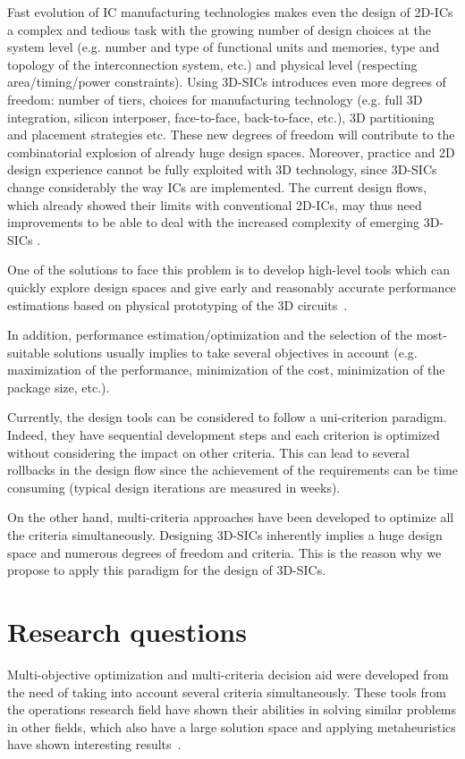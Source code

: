 Fast evolution of IC manufacturing technologies makes even the design of 2D-ICs a complex and tedious task with the growing number of design choices at the system level (e.g. number and type of functional units and memories, type and topology of the interconnection system, etc.) and physical level (respecting area/timing/power constraints). Using 3D-SICs introduces even more degrees of freedom: number of tiers, choices for manufacturing technology (e.g. full 3D integration, silicon interposer, face-to-face, back-to-face, etc.), 3D partitioning and placement strategies etc. These new degrees of freedom will contribute to the combinatorial explosion of already huge design spaces. Moreover, practice and 2D design experience cannot be fully exploited with 3D technology, since 3D-SICs change considerably the way ICs are implemented. The current design flows, which already showed their limits with conventional 2D-ICs, may thus need improvements to be able to deal with the increased complexity of emerging 3D-SICs \cite{vanderbiest06, PFF10}.

One of the solutions to face this problem is to develop high-level tools which can quickly explore design spaces and give early and reasonably accurate performance estimations based on physical prototyping of the 3D circuits~\cite{PFF10}.

In addition, performance estimation/optimization and the selection of the most-suitable solutions usually implies to take several objectives in account (e.g. maximization of the performance, minimization of the cost, minimization of the package size, etc.).

Currently, the design tools can be considered to follow a uni-criterion paradigm. Indeed, they have sequential development steps and each criterion is optimized without considering the impact on other criteria. This can lead to several rollbacks in the design flow since the achievement of the requirements can be time consuming (typical design iterations are measured in weeks).

On the other hand, multi-criteria approaches have been developed to optimize all the criteria simultaneously. Designing 3D-SICs inherently implies a huge design space and numerous degrees of freedom and criteria. This is the reason why we propose to apply this paradigm for the design of 3D-SICs.

\section*{Research questions}
Multi-objective optimization and multi-criteria decision aid were developed from the need of taking into account several criteria simultaneously. These tools from the operations research field have shown their abilities in solving similar problems in other fields, which also have a large solution space and applying metaheuristics have shown interesting results~\cite{talbi09}.

